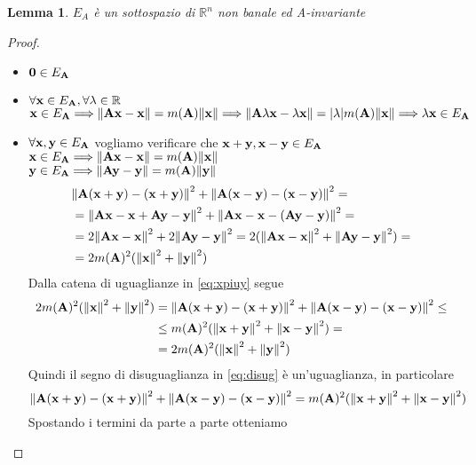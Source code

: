 \documentclass[a4paper,11pt,openright,twoside	]{book}
\newtheorem{lemma}[theorem]{Lemma}
\begin{document}
\begin{lemma}
$E_A$ è un sottospazio di $\mathbb{R}^{n}$ non banale ed A-invariante
\end{lemma} 
\begin{proof}
\begin{itemize}
\item $\vb{0} \in E_{\vb{A}} $  
\item $\forall \vb{x} \in E_{\vb{A}}, \forall \lambda \in \mathbb{R}$ \\
$\vb{x} \in E_{\vb{A}} \Longrightarrow \norm{\vb{Ax-x}} = m(\vb{A})\norm{\vb{x}} \Longrightarrow \norm{\vb{A} \lambda \vb{x} -\lambda \vb{x}}= | \lambda | m(\vb{A}) \norm{\vb{x}}  \Longrightarrow \lambda \vb{x} \in E_{\vb{A}} $
\item $\forall \vb{x, y} \in E_{\vb{A}} $ vogliamo verificare che $\vb{x+y, x-y} \in E_{\vb{A}}$ \\
$\vb{x} \in E_{\vb{A}} \Longrightarrow \norm{\vb{Ax-x}} = m(\vb{A})\norm{\vb{x}}$ \\
$\vb{y} \in E_{\vb{A}} \Longrightarrow \norm{\vb{Ay-y}} = m(\vb{A})\norm{\vb{y}}$ 
\begin{equation} 
\label{eq:xpiuy}
\begin{split}
& \norm{\vb{A(x+y) - (x+y)}}^2 + \norm{\vb{A(x-y) - (x-y)}}^2  = \\
& = \norm{\vb{Ax - x + Ay -y}}^2 + \norm{\vb{Ax - x -(Ay -y)}}^2 = \\
& = 2 \norm{\vb{Ax-x}}^2 + 2 \norm{\vb{Ay -y}}^2  = 2( \norm{\vb{Ax-x}}^2 + \norm{\vb{Ay-y}}^2) = \\
& = 2m(\vb{A})^2(\norm{\vb{x}}^2 + \norm{\vb{y}}^2) 
\end{split}
\end{equation}
Dalla catena di uguaglianze in \ref{eq:xpiuy} segue
\begin{equation} 
\label{eq:disug}
\begin{split}
2m(\vb{A})^2(\norm{\vb{x}}^2 + \norm{\vb{y}}^2) & = \norm{\vb{A(x+y) - (x+y)}}^2 + \norm{\vb{A(x-y) - (x-y)}}^2 \leq \\
& \leq m(\vb{A})^2(\norm{\vb{x+y}}^2 + \norm{\vb{x-y}}^2) = \\ 
& = 2m(\vb{A})^2(\norm{\vb{x}}^2 + \norm{\vb{y}}^2)
\end{split}
\end{equation}
Quindi il segno di disuguaglianza in \ref{eq:disug} è un'uguaglianza, in particolare 
\[   \norm{\vb{A(x+y) - (x+y)}}^2 + \norm{\vb{A(x-y) - (x-y)}}^2  = m(\vb{A})^2(\norm{\vb{x+y}}^2 + \norm{\vb{x-y}}^2)  \]
Spostando i termini da parte a parte otteniamo

\end{itemize}
\end{proof}
\end{document}
